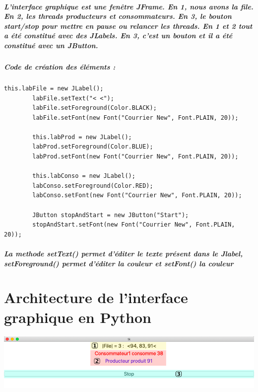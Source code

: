 \documentclass[a4paper]{report}
\begin{document}
\paragraph{
L'interface graphique est une fenêtre JFrame.
En 1, nous avons la file. En 2, les threads producteurs et consommateurs.
En 3, le bouton start/stop pour mettre en pause ou relancer les threads.
En 1 et 2 tout a été constitué avec des JLabels. En 3, c'est un bouton et il a été constitué avec un JButton.}

\paragraph{Code de création des éléments :}

\begin{verbatim}
this.labFile = new JLabel();
		labFile.setText("< <");
		labFile.setForeground(Color.BLACK);
		labFile.setFont(new Font("Courrier New", Font.PLAIN, 20));
		
		this.labProd = new JLabel();
		labProd.setForeground(Color.BLUE);
		labProd.setFont(new Font("Courrier New", Font.PLAIN, 20));
		
		this.labConso = new JLabel();
		labConso.setForeground(Color.RED);
		labConso.setFont(new Font("Courrier New", Font.PLAIN, 20));
		
		JButton stopAndStart = new JButton("Start");
		stopAndStart.setFont(new Font("Courrier New", Font.PLAIN, 20));
\end{verbatim}

\paragraph{La methode setText() permet d'éditer le texte présent dans le Jlabel, setForeground() permet d'éditer la couleur et setFont() la couleur}



\chapter{Architecture de l'interface graphique en Python}

\includegraphics[width=1\textwidth]{./fen_pyt.png}
\end{document}
